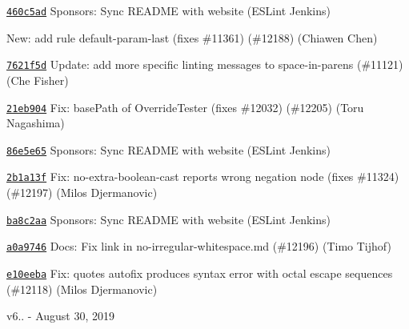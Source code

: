 \begin{DoxyItemize}
\item \href{https://github.com/eslint/eslint/commit/460c5ad176eaf39ff579cd96b3bcbe0539093f8f}{\texttt{ {\ttfamily 460c5ad}}} Sponsors\+: Sync R\+E\+A\+D\+ME with website (E\+S\+Lint Jenkins)
\item \href{https://github.com/eslint/eslint/commit/0313441d016c8aa0674c135f9da67a676e766ec5}{\texttt{ {}}} New\+: add rule default-\/param-\/last (fixes \#11361) (\#12188) (Chiawen Chen)
\item \href{https://github.com/eslint/eslint/commit/7621f5d2aa7d87e798b75ca47d6889c280597e99}{\texttt{ {\ttfamily 7621f5d}}} Update\+: add more specific linting messages to space-\/in-\/parens (\#11121) (Che Fisher)
\item \href{https://github.com/eslint/eslint/commit/21eb9044135c01b6c12188517bba840614483fc6}{\texttt{ {\ttfamily 21eb904}}} Fix\+: base\+Path of Override\+Tester (fixes \#12032) (\#12205) (Toru Nagashima)
\item \href{https://github.com/eslint/eslint/commit/86e5e657ea3fbf12b10524abcbc197afd215a060}{\texttt{ {\ttfamily 86e5e65}}} Sponsors\+: Sync R\+E\+A\+D\+ME with website (E\+S\+Lint Jenkins)
\item \href{https://github.com/eslint/eslint/commit/2b1a13fa0de8360586857f3ced8da514c971297d}{\texttt{ {\ttfamily 2b1a13f}}} Fix\+: no-\/extra-\/boolean-\/cast reports wrong negation node (fixes \#11324) (\#12197) (Milos Djermanovic)
\item \href{https://github.com/eslint/eslint/commit/ba8c2aa0154561fbeca33db0343cb39a7fbd9b4f}{\texttt{ {\ttfamily ba8c2aa}}} Sponsors\+: Sync R\+E\+A\+D\+ME with website (E\+S\+Lint Jenkins)
\item \href{https://github.com/eslint/eslint/commit/a0a9746724ccd22c721ddc1b25c566aa9acea154}{\texttt{ {\ttfamily a0a9746}}} Docs\+: Fix link in no-\/irregular-\/whitespace.\+md (\#12196) (Timo Tijhof)
\item \href{https://github.com/eslint/eslint/commit/e10eebab4abd193dee697c4de7fb2d95bbab2d8c}{\texttt{ {\ttfamily e10eeba}}} Fix\+: quotes autofix produces syntax error with octal escape sequences (\#12118) (Milos Djermanovic)
\end{DoxyItemize}

v6.. -\/ August 30, 2019


